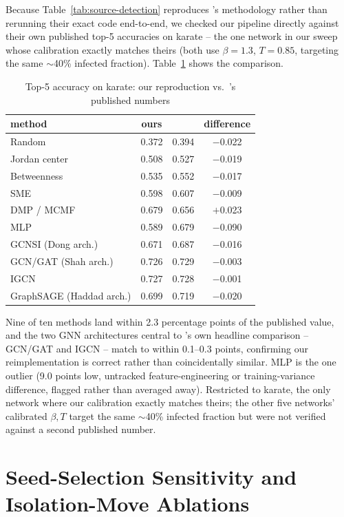 \documentclass[ASNA,number]{USG}
\newcommand{\up}{\rule{0pt}{2.6ex}}
\newcommand{\down}{\rule[-1.2ex]{0pt}{0pt}}
\begin{document}
Because Table~\ref{tab:source-detection} reproduces \citet{sterchi2026}'s
methodology rather than rerunning their exact code end-to-end, we checked
our pipeline directly against their own published top-5 accuracies on
karate -- the one network in our sweep whose calibration exactly matches
theirs (both use $\beta=1.3$, $T=0.85$, targeting the same $\sim$40\%
infected fraction). Table~\ref{tab:reproduction} shows the comparison.

\begin{table}[h]
\centering
\caption{Top-5 accuracy on karate: our reproduction vs.\ \citet{sterchi2026}'s published numbers\label{tab:reproduction}}
\begin{tabular}{@{}lccc@{}}
\hline
\up method & ours & \citet{sterchi2026} & difference \\
\hline
\up Random & 0.372 & 0.394 & $-$0.022 \\
Jordan center & 0.508 & 0.527 & $-$0.019 \\
Betweenness & 0.535 & 0.552 & $-$0.017 \\
SME & 0.598 & 0.607 & $-$0.009 \\
DMP / MCMF & 0.679 & 0.656 & $+$0.023 \\
MLP & 0.589 & 0.679 & $-$0.090 \\
GCNSI (Dong arch.) & 0.671 & 0.687 & $-$0.016 \\
GCN/GAT (Shah arch.) & 0.726 & 0.729 & $-$0.003 \\
IGCN & 0.727 & 0.728 & $-$0.001 \\
\down GraphSAGE (Haddad arch.) & 0.699 & 0.719 & $-$0.020 \\
\hline
\end{tabular}
Nine of ten methods land within 2.3 percentage points of the published
value, and the two GNN architectures central to \citet{sterchi2026}'s own
headline comparison -- GCN/GAT and IGCN -- match to within 0.1--0.3 points,
confirming our reimplementation is correct rather than coincidentally
similar. MLP is the one outlier (9.0 points low, untracked
feature-engineering or training-variance difference, flagged rather than
averaged away). Restricted to karate, the only network where our
calibration exactly matches theirs; the other five networks' calibrated
$\beta,T$ target the same $\sim$40\% infected fraction but were not
verified against a second published number.
\end{table}

\section{Seed-Selection Sensitivity and Isolation-Move Ablations}\label{ec:seed-sensitivity}
\end{document}
